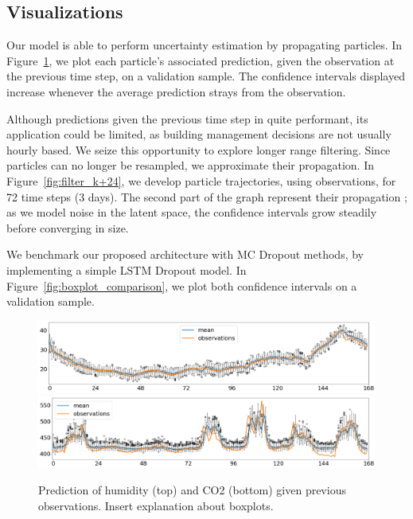 \documentclass{article}
\begin{document}
\subsection{Visualizations}%
\label{sub:visualizations}
Our model is able to perform uncertainty estimation by propagating particles.
In Figure~\ref{fig:filter_k+1}, we plot each particle's associated prediction, given the observation at the previous time step, on a validation sample.
The confidence intervals displayed increase whenever the average prediction strays from the observation.

Although predictions given the previous time step in quite performant, its application could be limited, as building management decisions are not usually hourly based.
We seize this opportunity to explore longer range filtering.
Since particles can no longer be resampled, we approximate their propagation.
In Figure~\ref{fig:filter_k+24}, we develop particle trajectories, using observations, for 72 time steps (3 days).
The second part of the graph represent their propagation ; as we model noise in the latent space, the confidence intervals grow steadily before converging in size.

We benchmark our proposed architecture with MC Dropout methods, by implementing a simple LSTM Dropout model.
In Figure~\ref{fig:boxplot_comparison}, we plot both confidence intervals on a validation sample.

\begin{figure}[htpb]
	\centering
	\includegraphics[width=\linewidth]{filter_kp1_hum.png}
	\includegraphics[width=\linewidth]{filter_kp1_co2.png}
	\caption{Prediction of humidity (top) and CO2 (bottom) given previous observations. Insert explanation about boxplots.}%
	\label{fig:filter_k+1}
\end{figure}
\end{document}
